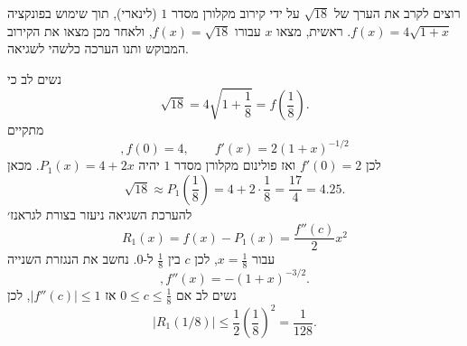 רוצים לקרב את הערך של $\sqrt{18}$ על ידי קירוב מקלורן מסדר
$1$
(לינארי), תוך שימוש בפונקציה $f(x)=4\sqrt{1+x}$.
ראשית, מצאו
$x$
עבורו
$f(x)=\sqrt{18}$,
ולאחר מכן מצאו את הקירוב המבוקש ותנו הערכה כלשהי לשגיאה.
\begin{solbox}
נשים לב כי
\[
\sqrt{18}=4\sqrt{1+\frac18}=f\!\left(\frac18\right).
\]
מתקיים
\[
,f(0)=4,\qquad f'(x)=2(1+x)^{-1/2}
\]
לכן
$f'(0)=2$
ואז פולינום מקלורן מסדר
$1$
יהיה
$P_1(x)=4+2x$.
מכאן
\[
\sqrt{18}\approx P_1\left(\frac{1}{8}\right)=4+2\cdot\frac18=\frac{17}{4}=4.25.
\]
להערכת השגיאה
ניעזר בצורת לגראנז׳
$$R_1(x)=f(x)-P_1(x)=\frac{f''(c)}{2}x^2$$
עבור
$x=\frac{1}{8}$,
לכן
$c$
בין
$\frac{1}{8}$
ל-$0$.
נחשב את הנגזרת השנייה
\[
,f''(x)=-(1+x)^{-3/2}.
\]
נשים לב אם
\(0\le c\le\frac18\)
אז
\(|f''(c)|\le 1\),
לכן
\[
|R_1(1/8)|\le \frac12\left(\frac18\right)^2=\frac{1}{128}.
\]
\end{solbox}
